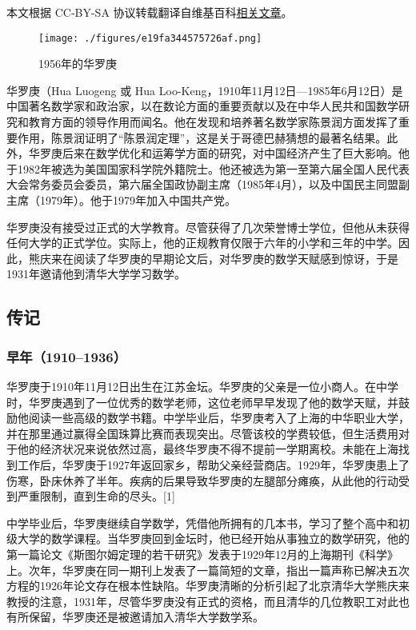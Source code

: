 
本文根据 CC-BY-SA 协议转载翻译自维基百科\href{https://en.wikipedia.org/wiki/Hua_Luogeng}{相关文章}。

\begin{figure}[ht]
\centering
\texttt{[image: ./figures/e19fa344575726af.png]}
\caption{1956年的华罗庚} \label{fig_Luogen_1}
\end{figure}
华罗庚（Hua Luogeng 或 Hua Loo-Keng，1910年11月12日—1985年6月12日）是中国著名数学家和政治家，以在数论方面的重要贡献以及在中华人民共和国数学研究和教育方面的领导作用而闻名。他在发现和培养著名数学家陈景润方面发挥了重要作用，陈景润证明了“陈景润定理”，这是关于哥德巴赫猜想的最著名结果。此外，华罗庚后来在数学优化和运筹学方面的研究，对中国经济产生了巨大影响。他于1982年被选为美国国家科学院外籍院士。他还被选为第一至第六届全国人民代表大会常务委员会委员，第六届全国政协副主席（1985年4月），以及中国民主同盟副主席（1979年）。他于1979年加入中国共产党。

华罗庚没有接受过正式的大学教育。尽管获得了几次荣誉博士学位，但他从未获得任何大学的正式学位。实际上，他的正规教育仅限于六年的小学和三年的中学。因此，熊庆来在阅读了华罗庚的早期论文后，对华罗庚的数学天赋感到惊讶，于是1931年邀请他到清华大学学习数学。
\subsection{传记}
\subsubsection{早年（1910–1936）}  
华罗庚于1910年11月12日出生在江苏金坛。华罗庚的父亲是一位小商人。在中学时，华罗庚遇到了一位优秀的数学老师，这位老师早早发现了他的数学天赋，并鼓励他阅读一些高级的数学书籍。中学毕业后，华罗庚考入了上海的中华职业大学，并在那里通过赢得全国珠算比赛而表现突出。尽管该校的学费较低，但生活费用对于他的经济状况来说依然过高，最终华罗庚不得不提前一学期离校。未能在上海找到工作后，华罗庚于1927年返回家乡，帮助父亲经营商店。1929年，华罗庚患上了伤寒，卧床休养了半年。疾病的后果导致华罗庚的左腿部分瘫痪，从此他的行动受到严重限制，直到生命的尽头。[1]

中学毕业后，华罗庚继续自学数学，凭借他所拥有的几本书，学习了整个高中和初级大学的数学课程。当华罗庚回到金坛时，他已经开始从事独立的数学研究，他的第一篇论文《斯图尔姆定理的若干研究》发表于1929年12月的上海期刊《科学》上。次年，华罗庚在同一期刊上发表了一篇简短的文章，指出一篇声称已解决五次方程的1926年论文存在根本性缺陷。华罗庚清晰的分析引起了北京清华大学熊庆来教授的注意，1931年，尽管华罗庚没有正式的资格，而且清华的几位教职工对此也有所保留，华罗庚还是被邀请加入清华大学数学系。

